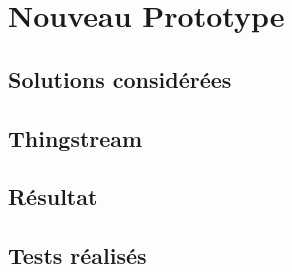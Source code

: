 
\section{Nouveau Prototype}

\subsection{Solutions considérées}
\subsection{Thingstream}
\subsection{Résultat}
\subsection{Tests réalisés}
